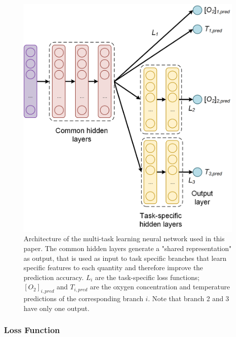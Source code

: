 \documentclass[sensors,article,submit,moreauthors,pdftex,10pt,a4paper]{Definitions/mdpi}
\begin{document}
\begin{figure}[t!]
\centering
\includegraphics[width=8.7 cm]{NN_MTL.png}
\caption{Architecture of the multi-task learning neural network used in this paper. The common hidden layers generate a "shared representation" as output, that is used as input to task specific branches that learn specific features to each quantity and therefore improve the prediction accuracy. $L_i$ are the task-specific loss functions; $[O_2]_{i,pred}$ and $T_{i,pred}$ are the oxygen concentration and temperature predictions of  the corresponding branch $i$. Note that branch 2 and 3 have only one output.} 
\label{fig:NN_MTL_O2_T}
\end{figure}


\subsubsection{Loss Function}
\end{document}
